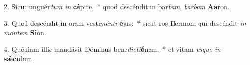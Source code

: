 2. Sicut unguén\textit{tum} \textit{in} \textbf{cá}pite,~*  quod descéndit in bar\textit{bam}, \textit{bar}\textit{bam} \textbf{A}\textbf{a}ron.\

3. Quod descéndit in oram vesti\textit{mén}\textit{ti} \textbf{e}jus:~*  sicut ros Hermon, qui descéndit \textit{in} \textit{mon}\textit{tem} \textbf{Si}on.\

4. Quóniam illic mandávit Dóminus bene\textit{dic}\textit{ti}\textbf{ó}nem,~*  et vitam \textit{us}\textit{que} \textit{in} \textbf{sǽ}\textbf{cu}lum.\


